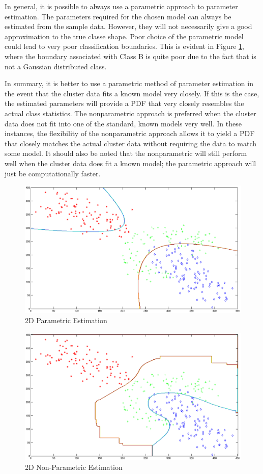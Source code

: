 In general, it is possible to always use a parametric approach to parameter
estimation.  The parameters required for the chosen model can always be
estimated from the sample data.  However, they will not necessarily give a good
approximation to the true classe shape.  Poor choice of the parametric model
could lead to very poor classification boundaries.  This is evident in Figure
\ref{fig:twod-par}, where the boundary associated with Class B is quite poor due to the
fact that is not a Gaussian distributed class.

In summary, it is better to use a parametric method of parameter estimation in
the event that the cluster data fits a known model very closely.  If this is
the case, the estimated parameters will provide a PDF that very closely
resembles the actual class statistics.  The nonparametric approach is preferred
when the cluster data does not fit into one of the standard, known models very
well.  In these instances, the flexibility of the nonparametric approach allows
it to yield a PDF that closely matches the actual cluster data without
requiring the data to match some model.  It should also be noted that the
nonparametric will still perform well when the cluster data does fit a known
model; the parametric approach will just be computationally faster.

\begin{figure}
\label{fig:twod-par}
\includegraphics[scale=0.4]{twod-par}
\caption{2D Parametric Estimation}
\end{figure}

\begin{figure}
\label{fig:twod-nonpar}
\includegraphics[scale=0.4]{twod-nonpar}
\caption{2D Non-Parametric Estimation}
\end{figure}
